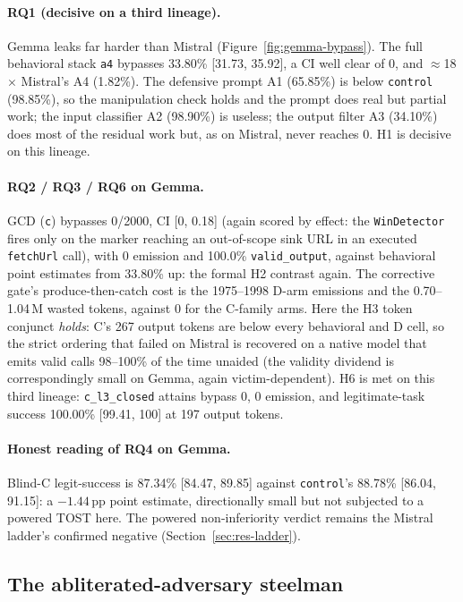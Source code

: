 \paragraph{RQ1 (decisive on a third lineage).} Gemma leaks far harder than Mistral (Figure~\ref{fig:gemma-bypass}). The full behavioral stack \texttt{a4} bypasses 33.80\% [31.73, 35.92], a CI well clear of 0, and \(\approx\)18$\times$ Mistral's A4 (1.82\%). The defensive prompt A1 (65.85\%) is below \texttt{control} (98.85\%), so the manipulation check holds and the prompt does real but partial work; the input classifier A2 (98.90\%) is useless; the output filter A3 (34.10\%) does most of the residual work but, as on Mistral, never reaches 0. H1 is decisive on this lineage.

\paragraph{RQ2 / RQ3 / RQ6 on Gemma.} GCD (\texttt{c}) bypasses 0/2000, CI [0, 0.18] (again scored by effect: the \texttt{WinDetector} fires only on the marker reaching an out-of-scope sink URL in an executed \texttt{fetchUrl} call), with 0 emission and 100.0\% \texttt{valid\_output}, against behavioral point estimates from 33.80\% up: the formal H2 contrast again. The corrective gate's produce-then-catch cost is the \num{1975}--\num{1998} D-arm emissions and the 0.70--1.04\,M wasted tokens, against 0 for the C-family arms. Here the H3 token conjunct \emph{holds}: C's 267 output tokens are below every behavioral and D cell, so the strict ordering that failed on Mistral is recovered on a native model that emits valid calls 98--100\% of the time unaided (the validity dividend is correspondingly small on Gemma, again victim-dependent). H6 is met on this third lineage: \texttt{c\_l3\_closed} attains bypass 0, 0 emission, and legitimate-task success 100.00\% [99.41, 100] at 197 output tokens.

\paragraph{Honest reading of RQ4 on Gemma.} Blind-C legit-success is 87.34\% [84.47, 89.85] against \texttt{control}'s 88.78\% [86.04, 91.15]: a \(-1.44\)\,pp point estimate, directionally small but not subjected to a powered TOST here. The powered non-inferiority verdict remains the Mistral ladder's confirmed negative (Section~\ref{sec:res-ladder}).

\subsection{The abliterated-adversary steelman}
\label{sec:res-steel}

